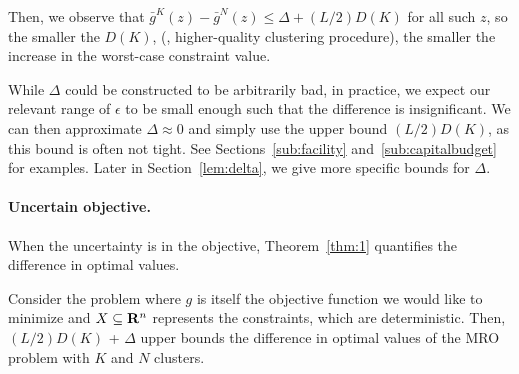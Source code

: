 {
Then, we observe that $ \bar{g}^K(z)  - \bar{g}^N(z)\leq \Delta +(L/2) D(K)$ for all such $z$, so the smaller the $D(K)$, (\ie, higher-quality clustering procedure), the smaller the increase in the worst-case constraint value. 

\begin{remark} \label{rem:support}
While $\Delta$ could be constructed to be arbitrarily bad, in practice, we expect our relevant range of $\epsilon$ to be small enough such that the difference is insignificant.
We can then approximate $\Delta \approx 0$ and simply use the upper bound $(L/2)D(K)$, as this bound is often not tight.
See Sections~\ref{sub:facility} and~\ref{sub:capitalbudget} for examples. Later in Section~\ref{lem:delta}, we give more specific bounds for $\Delta$. 
\end{remark}

\paragraph{Uncertain objective.}%
\label{par:uncertain_objective_}
When the uncertainty is in the objective, Theorem~\ref{thm:1} quantifies the difference in optimal values.
\begin{corollary}
	\label{cor:obj_unc}
Consider the problem where $g$ is itself the objective function we would like to minimize and $X \subseteq {\mathbf R}^n$ represents the constraints, which are deterministic.
Then, $(L/2)D(K)$ + $\Delta$ upper bounds the difference in optimal values of the \gls{MRO} problem with $K$ and $N$ clusters.
\end{corollary}

}
